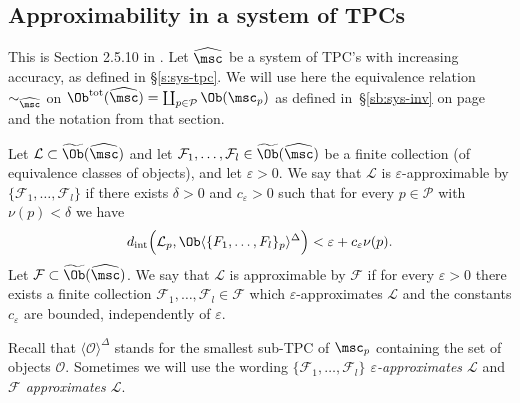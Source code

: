 \subsection{Approximability in a system of TPCs} \label{s:approximability}
This is Section 2.5.10 in \cite{ABC26}. Let $\widehat{\msc}$ be a system of TPC's with increasing accuracy, as
defined in \S\ref{s:sys-tpc}. We will use here the equivalence relation
  $\sim_{\widehat{\msc}}$ on
  $\Ob^{\text{tot}}(\widehat{\msc}) = \coprod_{p\in \mathcal{P}}
  \Ob(\msc_p)$ as defined in~\S\ref{sb:sys-inv} on
  page~\pageref{p:equiv-ob} and the notation from that section.
\begin{dfn} \label{d:approx-sys} Let
  $\mathcal{L} \subset \widetilde{\Ob}(\widehat{\msc})$ and let
  $\mathcal{F}_1, \ldots, \mathcal{F}_l \in
  \widetilde{\Ob}(\widehat{\msc})$ be a finite collection (of equivalence
  classes of objects), and let $\varepsilon>0$. We say that $\mathcal{L}$
  is $\varepsilon$-approximable by
  $\{\mathcal{F}_1, \ldots, \mathcal{F}_l\}$ if there exists
  $\delta>0$ and $c_{\varepsilon}>0$ such that for every
  $p \in \mathcal{P}$ with $\nu(p) < \delta$ we have
  $${d}_{\text{int}} \Bigl(\mathcal{L}_p,
  \Ob \langle \{F_1, \ldots, F_l\}_p \rangle^{\Delta} \Bigr)
  < \varepsilon + c_{\varepsilon}\nu(p).$$
  Let $\mathcal{F} \subset \widetilde{\Ob}(\widehat{\msc})$. We say that
  $\mathcal{L}$ is approximable by $\mathcal{F}$ if for every
  $\varepsilon>0$ there exists a finite collection
  $\mathcal{F}_1, \ldots, \mathcal{F}_l \in \mathcal{F}$ which
  $\varepsilon$-approximates $\mathcal{L}$ and the constants $c_{\varepsilon}$ 
  are bounded, independently of $\varepsilon$.

  \end{dfn}
  Recall that 
  $\langle \mathcal{O} \rangle^{\Delta}$ stands for the
  smallest sub-TPC of $\msc_p$ containing the set of
  objects $\mathcal{O}$. Sometimes we will use the wording {\em
    $\{\mathcal{F}_1, \ldots, \mathcal{F}_l\}$ $\varepsilon$-approximates
    $\mathcal{L}$} and {\em $\mathcal{F}$ approximates $\mathcal{L}$}.

\

